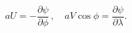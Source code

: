 \begin{equation}
    aU=-\frac{\partial\psi}{\partial\phi}\,,\quad aV\cos\phi=\frac{\partial\psi}{\partial\lambda}.
\label{EQN:Streamfunction}
\end{equation}
